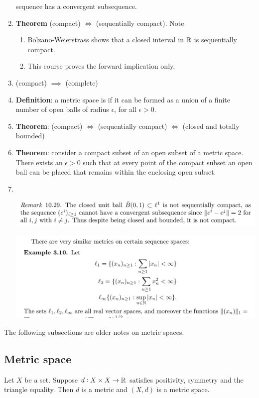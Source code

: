 \begin{enumerate}
  sequence has a convergent subsequence.
\item {\bf Theorem} (compact) $\iff$ (sequentially compact). Note
  \begin{enumerate}[label=(\roman*)]
  \item Bolzano-Weierstrass shows that a closed interval in $\mathbb{R}$ is sequentially compact.
  \item This course proves the forward implication only.
  \end{enumerate}
\item (compact) $\implies$ (complete)
\item {\bf Definition}: a metric space is  if it can be formed as a union of
  a finite number of open balls of radius $\epsilon$, for all $\epsilon > 0$.
\item {\bf Theorem}: (compact) $\iff$ (sequentially compact) $\iff$ (closed and totally bounded)
\item {\bf Theorem}: consider a compact subset of an open subset of a metric space. There exists an
  $\epsilon > 0$ such that at every point of the compact subset an open ball can be placed that
  remains within the enclosing open subset.
\item~\\
  \begin{mdframed}
    \includegraphics[width=400pt]{img/oxford-a2-compactness-counterexample.png}
  \end{mdframed}
  \begin{mdframed}
    \includegraphics[width=400pt]{img/oxford-a2-compactness-counterexample-2.png}
  \end{mdframed}
\end{enumerate}

\newpage


The following subsections are older notes on metric spaces.
\subsection{Metric space}
\begin{definition}
  Let $X$ be a set. Suppose $d:X \times X \to \mathbb{R}$ satisfies positivity, symmetry and the triangle
  equality. Then $d$ is a metric and $(X, d)$ is a metric space.
\end{definition}

